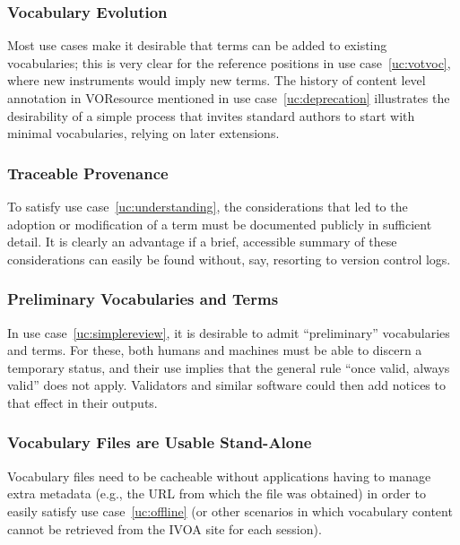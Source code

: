 \documentclass[11pt,a4paper]{ivoa}
\begin{document}
\subsubsection{Vocabulary Evolution}
\label{req:evolution}

Most use cases make it desirable that terms can be added to existing
vocabularies; this is very clear for the reference positions in
use case~\ref{uc:votvoc}, where new instruments would imply new
terms.  The history of content level annotation in VOResource mentioned
in use case~\ref{uc:deprecation} illustrates the desirability of a
simple process that invites standard authors to start with minimal
vocabularies, relying on later extensions.

\subsubsection{Traceable Provenance}
\label{req:traceable}

To satisfy use case~\ref{uc:understanding}, the considerations that led
to the adoption or modification of a term must be documented publicly
in sufficient detail.  It is clearly an advantage if a brief, accessible
summary of these considerations can easily be found without, say,
resorting to version control logs.

\subsubsection{Preliminary Vocabularies and Terms}
\label{req:preliminary}

In use case~\ref{uc:simplereview}, it is desirable to admit
``preliminary'' vocabularies and terms.  For these, both humans
and machines must be able to discern a temporary status, and
their use implies that the general rule ``once valid, always
valid'' does not apply.  Validators and similar software could
then add notices to that effect in their outputs.

\subsubsection{Vocabulary Files are Usable Stand-Alone}
\label{req:standalone}

Vocabulary files need to be cacheable without applications having to
manage extra metadata (e.g., the URL from which the file was obtained)
in order to easily satisfy use case~\ref{uc:offline} (or other scenarios
in which vocabulary content cannot be retrieved from the IVOA
site for each session).
\end{document}
